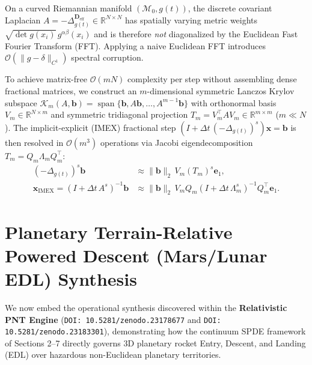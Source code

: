 \documentclass[11pt,a4paper,reqno]{article}
\theoremstyle{definition}
\theoremstyle{remark}
\begin{document}
On a curved Riemannian manifold $(\mathcal{M}_0, g(t))$, the discrete covariant Laplacian $A = -\Delta_{g(t)}^{\mathbf{D}_{\mathrm{eff}}} \in \mathbb{R}^{N \times N}$ has spatially varying metric weights $\sqrt{\det g(x_i)}\,g^{\alpha\beta}(x_i)$ and is therefore \emph{not} diagonalized by the Euclidean Fast Fourier Transform (FFT). Applying a naive Euclidean FFT introduces $\mathcal{O}(\|g - \delta\|_{C^1})$ spectral corruption.

To achieve matrix-free $\mathcal{O}(m N)$ complexity per step without assembling dense fractional matrices, we construct an $m$-dimensional symmetric Lanczos Krylov subspace $\mathcal{K}_m(A, \mathbf{b}) = \operatorname{span}\{\mathbf{b}, A\mathbf{b}, \dots, A^{m-1}\mathbf{b}\}$ \cite{saad1992analysis, higham2008functions} with orthonormal basis $V_m \in \mathbb{R}^{N \times m}$ and symmetric tridiagonal projection $T_m = V_m^\top A V_m \in \mathbb{R}^{m \times m}$ ($m \ll N$). The implicit-explicit (IMEX) fractional step $(I + \Delta t\,(-\Delta_{g(t)})^s)\mathbf{x} = \mathbf{b}$ is then resolved in $\mathcal{O}(m^3)$ operations via Jacobi eigendecomposition $T_m = Q_m \Lambda_m Q_m^\top$:
\begin{align}\label{eq:krylov_imex}
  (-\Delta_{g(t)})^s \mathbf{b} &\approx \|\mathbf{b}\|_2\, V_m (T_m)^s \mathbf{e}_1, \nonumber \\
  \mathbf{x}_{\mathrm{IMEX}} = \left(I + \Delta t\,A^s\right)^{-1}\mathbf{b} &\approx \|\mathbf{b}\|_2\, V_m Q_m \left(I + \Delta t\,\Lambda_m^s\right)^{-1} Q_m^\top \mathbf{e}_1.
\end{align}

\section{Planetary Terrain-Relative Powered Descent (Mars/Lunar EDL) Synthesis}

We now embed the operational synthesis discovered within the \textbf{Relativistic PNT Engine} (\texttt{DOI: 10.5281/zenodo.23178677} and \texttt{DOI: 10.5281/zenodo.23183301}), demonstrating how the continuum SPDE framework of Sections 2--7 directly governs 3D planetary rocket Entry, Descent, and Landing (EDL) over hazardous non-Euclidean planetary territories.
\end{document}
